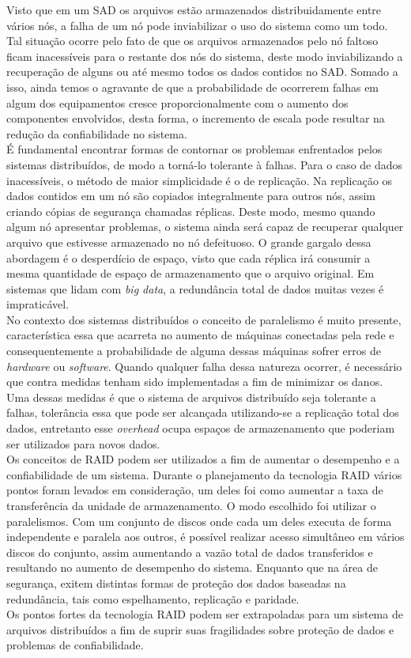 	Visto que em um SAD os arquivos estão armazenados distribuidamente entre vários nós, a falha de um nó pode inviabilizar o uso do sistema como um todo. Tal situação ocorre pelo fato de que os arquivos armazenados pelo nó faltoso ficam inacessíveis para o restante dos nós do sistema, deste modo inviabilizando a recuperação de alguns ou até mesmo todos os dados contidos no SAD. Somado a isso, ainda temos o agravante de que a probabilidade de ocorrerem falhas em algum dos equipamentos cresce proporcionalmente com o aumento dos componentes envolvidos, desta forma, o incremento de escala pode resultar na redução da confiabilidade no sistema.
	\\
	
	É fundamental encontrar formas de contornar os problemas enfrentados pelos sistemas distribuídos, de modo a torná-lo tolerante à falhas. Para o caso de dados inacessíveis, o método de maior simplicidade é o de replicação. Na replicação os dados contidos em um nó são copiados integralmente para outros nós, assim criando cópias de segurança chamadas réplicas. Deste modo, mesmo quando algum nó apresentar problemas, o sistema ainda será capaz de recuperar qualquer arquivo que estivesse armazenado no nó defeituoso. O grande gargalo dessa abordagem é o desperdício de espaço, visto que cada réplica irá consumir a mesma quantidade de espaço de armazenamento que o arquivo original. Em sistemas que lidam com \textit{big data}, a redundância total de dados muitas vezes é impraticável.
	\\
		
	No contexto dos sistemas distribuídos o conceito de paralelismo é muito presente, característica essa que acarreta no aumento de máquinas conectadas pela rede e consequentemente a probabilidade de alguma dessas máquinas sofrer erros de \textit{hardware} ou \textit{software}. Quando qualquer falha dessa natureza ocorrer, é necessário que contra medidas tenham sido implementadas a fim de minimizar os danos. Uma dessas medidas é que o sistema de arquivos distribuído seja tolerante a falhas, tolerância essa que pode ser alcançada utilizando-se a replicação total dos dados, entretanto esse \textit{overhead} ocupa espaços de armazenamento que poderiam ser utilizados para novos dados.
	\\
	
	Os conceitos de RAID podem ser utilizados a fim de aumentar o desempenho e a confiabilidade de um sistema. Durante o planejamento da tecnologia RAID vários pontos foram levados em consideração, um deles foi como aumentar a taxa de transferência da unidade de armazenamento. O modo escolhido foi utilizar o paralelismos. Com um conjunto de discos onde cada um deles executa de forma independente e paralela aos outros, é possível realizar acesso simultâneo em vários discos do conjunto, assim aumentando a vazão total de dados transferidos e resultando no aumento de desempenho do sistema. Enquanto que na área de segurança, exitem distintas formas de proteção dos dados baseadas na redundância, tais como espelhamento, replicação e paridade.
	\\
	
	Os pontos fortes da tecnologia RAID podem ser extrapoladas para um sistema de arquivos distribuídos a fim de suprir suas fragilidades sobre proteção de dados e problemas de confiabilidade.
	\\
